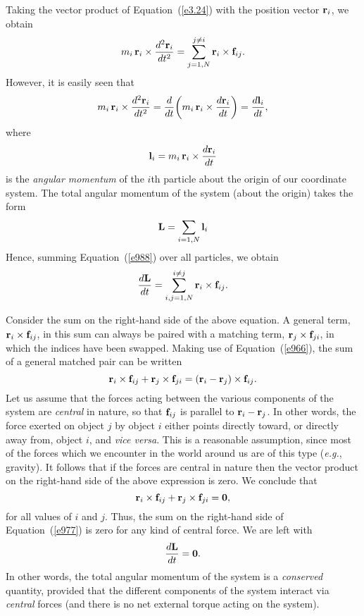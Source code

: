Taking the vector product of Equation~(\ref{e3.24}) with the position vector ${\bf r}_i$, we
obtain
\begin{equation}\label{e988}
m_i\,{\bf r}_i\times \frac{d^2{\bf r}_i }{dt^2}= \sum_{j=1,N}^{j\neq i} {\bf r}_i\times {\bf f}_{ij}.
\end{equation}
However, it is easily seen that
\begin{equation}
m_i\,{\bf r}_i\times \frac{d^2{\bf r}_i }{dt^2}= \frac{d}{dt}\!\left( m_i\,{\bf r}_i\times
\frac{d{\bf r}_i}{dt}\right) = \frac{d{\bf l}_i}{dt},
\end{equation}
where
\begin{equation}
{\bf l}_i = m_i\,{\bf r}_i\times \frac{d{\bf r}_i}{dt}
\end{equation}
is the {\em angular momentum}\/ of the $i$th particle about the origin
of our coordinate system.
The total angular momentum of the system (about the origin) takes the form
\begin{equation}
{\bf L} = \sum_{i=1,N} {\bf l}_i
\end{equation}
Hence, summing Equation~(\ref{e988}) over all particles, we obtain
\begin{equation}\label{e977}
\frac{d {\bf L}}{dt} = \sum_{i,j = 1,N}^{i\neq j} {\bf r}_i\times {\bf f}_{ij}.
\end{equation}

Consider  the sum on the right-hand side of the above equation. A general term,
${\bf r}_i\times {\bf f}_{ij}$, in this sum can always be paired with a
matching term, ${\bf r}_j\times {\bf f}_{ji}$, in which the indices have been swapped.
Making use of Equation~(\ref{e966}), the sum of a general matched pair  can be written
\begin{equation}
{\bf r}_i\times {\bf f}_{ij}+{\bf r}_j\times {\bf f}_{ji} = 
({\bf r}_i-{\bf r}_j)\times {\bf f}_{ij}.
\end{equation}
Let us assume that the  forces acting between the
various components of the system are {\em central}\/ in nature, so
that  ${\bf f}_{ij}$ is parallel
to ${\bf r}_i-{\bf r}_j$. In other words, the force exerted on object $j$
by object $i$ either points directly toward, or directly away from, object $i$,
and {\em vice versa}. 
 This is a reasonable assumption,
since most of the forces which we encounter in the world around us  are of this type ({\em e.g.}, gravity). 
It follows that if the forces are central in nature then the vector product
on the right-hand side of the above expression is zero.
We conclude that
\begin{equation}
{\bf r}_i\times {\bf f}_{ij}+{\bf r}_j\times {\bf f}_{ji} = {\bf 0},
\end{equation}
for all values of $i$ and $j$. Thus, the sum on the right-hand side of Equation~(\ref{e977}) is zero for any kind of central force. We are left with
\begin{equation}\label{e955}
\frac{d {\bf L}}{dt} = {\bf 0}.
\end{equation}
In other words, the total angular momentum of the system is
a {\em conserved}\/ quantity, provided that the different components of the
system interact via {\em central}\/ forces (and there is no net external torque
acting on the system).

